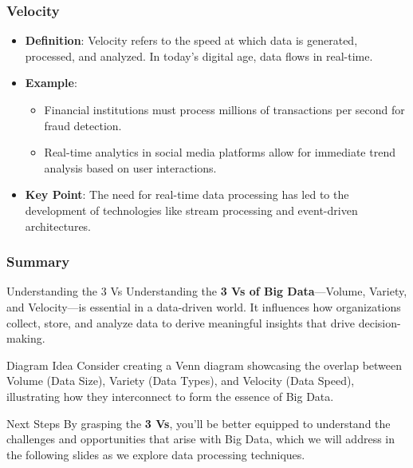 \documentclass[aspectratio=169]{beamer}
\begin{document}
\begin{frame}[fragile]
    \frametitle{Velocity}
    \begin{itemize}
        \item \textbf{Definition}: Velocity refers to the speed at which data is generated, processed, and analyzed. In today’s digital age, data flows in real-time.
        \item \textbf{Example}:
        \begin{itemize}
            \item Financial institutions must process millions of transactions per second for fraud detection.
            \item Real-time analytics in social media platforms allow for immediate trend analysis based on user interactions.
        \end{itemize}
        \item \textbf{Key Point}: The need for real-time data processing has led to the development of technologies like stream processing and event-driven architectures.
    \end{itemize}
\end{frame}

\begin{frame}[fragile]
    \frametitle{Summary}
    \begin{block}{Understanding the 3 Vs}
        Understanding the \textbf{3 Vs of Big Data}—Volume, Variety, and Velocity—is essential in a data-driven world. It influences how organizations collect, store, and analyze data to derive meaningful insights that drive decision-making.
    \end{block}
    \begin{block}{Diagram Idea}
        Consider creating a Venn diagram showcasing the overlap between Volume (Data Size), Variety (Data Types), and Velocity (Data Speed), illustrating how they interconnect to form the essence of Big Data.
    \end{block}
    \begin{block}{Next Steps}
        By grasping the \textbf{3 Vs}, you’ll be better equipped to understand the challenges and opportunities that arise with Big Data, which we will address in the following slides as we explore data processing techniques.
    \end{block}
\end{frame}

\begin{frame}
    \titlepage
\end{frame}
\end{document}
